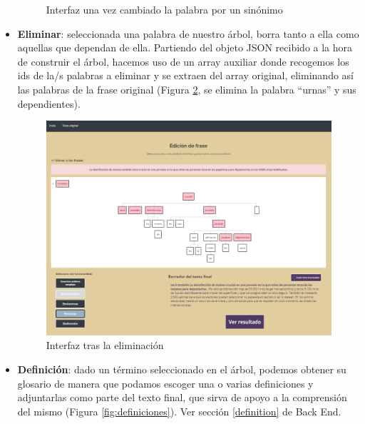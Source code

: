\begin{itemize}
\begin{figure}[h!]
	
	\caption{Interfaz una vez cambiado la palabra por un sinónimo}
	\label{fig:resultadoSinonimos}
\end{figure}

\item \textbf{Eliminar}: seleccionada una palabra de nuestro árbol, borra tanto a ella como aquellas que dependan de ella. Partiendo del objeto JSON recibido a la hora de construir el árbol, hacemos uso de un array auxiliar donde recogemos los ids de la/s palabras a eliminar y se extraen del array original, eliminando así las palabras de la frase original (Figura \ref{fig:eliminacion}, se elimina la palabra ``urnas'' y sus dependientes).
	 \begin{figure}[h!]
	\centering
	
	
	\includegraphics[scale=0.56]{Imagenes/Figuras/EliminacionNodos}
	
	
	\caption{Interfaz tras la eliminación}
	\label{fig:eliminacion}
\end{figure} 

\item \textbf{Definición}: dado un término seleccionado en el árbol, podemos obtener su glosario de manera que podamos escoger una o varias definiciones y adjuntarlas como parte del texto final, que sirva de apoyo a la comprensión del mismo (Figura \ref{fig:definiciones}). Ver sección \ref{definition} de Back End.
	 \begin{figure}[h!]
	\centering
	

\end{figure}
\end{itemize}
